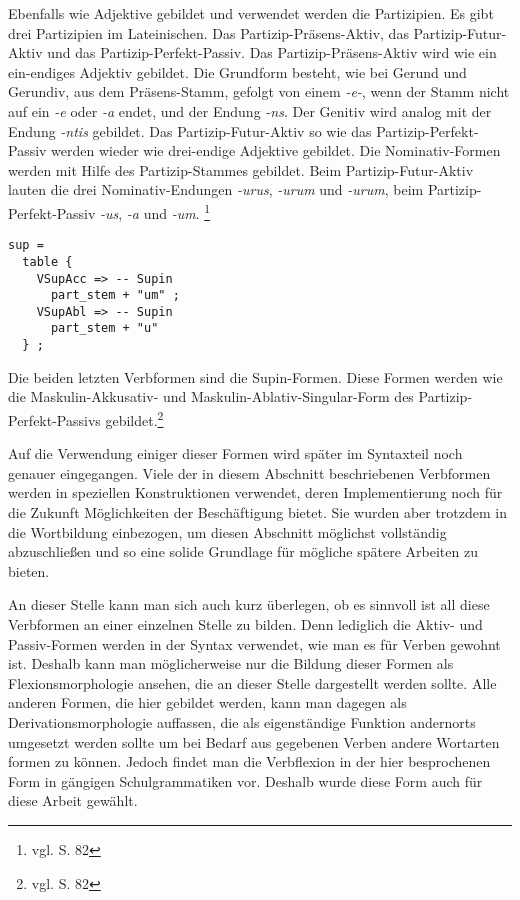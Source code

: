 Ebenfalls wie Adjektive gebildet und verwendet werden die Partizipien. Es gibt drei Partizipien im Lateinischen. Das Partizip-Präsens-Aktiv, das Partizip-Futur-Aktiv und das Partizip-Perfekt-Passiv. Das Partizip-Präsens-Aktiv wird wie ein ein-endiges Adjektiv gebildet. Die Grundform besteht, wie bei Gerund und Gerundiv, aus dem Präsens-Stamm, gefolgt von einem \textit{-e-}, wenn der Stamm nicht auf ein \textit{-e} oder \textit{-a} endet, und der Endung \textit{-ns}. Der Genitiv wird analog mit der Endung \textit{-ntis} gebildet. Das Partizip-Futur-Aktiv so wie das Partizip-Perfekt-Passiv werden wieder wie drei-endige Adjektive gebildet. Die Nominativ-Formen werden mit Hilfe des Partizip-Stammes gebildet. Beim Partizip-Futur-Aktiv lauten die drei Nominativ-Endungen \textit{-urus}, \textit{-urum} und \textit{-urum}, beim Partizip-Perfekt-Passiv \textit{-us}, \textit{-a} und \textit{-um}. \footnote{vgl. \cite{BAYER-LINDAUER1994} S. 82} \par
\begin{lstlisting}[float=h!tp,caption={Ausschnitt aus der Funktion \texttt{mkVerb} um Supin-Verbformen zu bilden (vgl. \textbf{ResLat.gf})},label={GF-Res-MkVerb-Sup},basicstyle=\small]
sup = 
  table {
    VSupAcc => -- Supin
      part_stem + "um" ;
    VSupAbl => -- Supin
      part_stem + "u" 
  } ;
\end{lstlisting}
Die beiden letzten Verbformen sind die Supin-Formen. Diese Formen werden wie die Maskulin-Akkusativ- und Maskulin-Ablativ-Singular-Form des Partizip-Perfekt-Passivs gebildet.\footnote{vgl. \cite{BAYER-LINDAUER1994} S. 82} \par
Auf die Verwendung einiger dieser Formen wird später im Syntaxteil noch genauer eingegangen. Viele der in diesem Abschnitt beschriebenen Verbformen werden in speziellen Konstruktionen verwendet, deren Implementierung noch für die Zukunft Möglichkeiten der Beschäftigung bietet. Sie wurden aber trotzdem in die Wortbildung einbezogen, um diesen Abschnitt möglichst vollständig abzuschließen und so eine solide Grundlage für mögliche spätere Arbeiten zu bieten. \par
An dieser Stelle kann man sich auch kurz überlegen, ob es sinnvoll ist all diese Verbformen an einer einzelnen Stelle zu bilden. Denn lediglich die Aktiv- und Passiv-Formen werden in der Syntax verwendet, wie man es für Verben gewohnt ist. Deshalb kann man möglicherweise nur die Bildung dieser Formen als Flexionsmorphologie ansehen, die an dieser Stelle dargestellt werden sollte. Alle anderen Formen, die hier gebildet werden, kann man dagegen als Derivationsmorphologie auffassen, die als eigenständige Funktion andernorts umgesetzt werden sollte um bei Bedarf aus gegebenen Verben andere Wortarten formen zu können. Jedoch findet man die Verbflexion in der hier besprochenen Form in gängigen Schulgrammatiken vor. Deshalb wurde diese Form auch für diese Arbeit gewählt. %
\FloatBarrier

